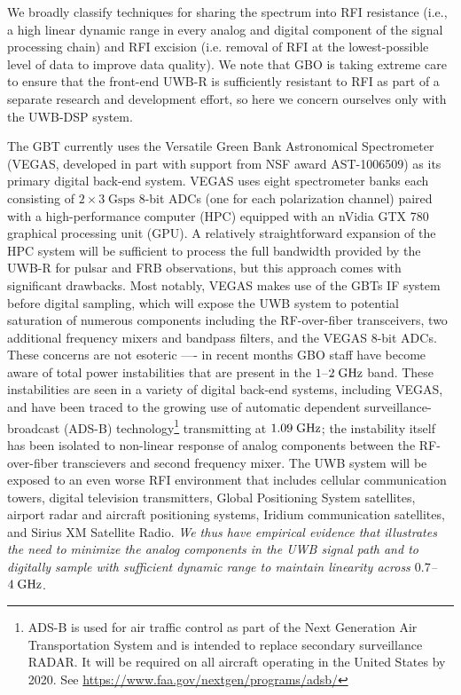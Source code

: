 \documentclass[10pt]{myNSF}
\begin{document}
We broadly classify techniques for sharing the spectrum into RFI
resistance (i.e., a high linear dynamic range in every analog and
digital component of the signal processing chain) and RFI excision
(i.e. removal of RFI at the lowest-possible level of data to improve
data quality).  We note that GBO is taking extreme care to ensure that
the front-end UWB-R is sufficiently resistant to RFI as part of a
separate research and development effort, so here we concern ourselves
only with the UWB-DSP system.

 The GBT currently uses the Versatile
Green Bank Astronomical Spectrometer (VEGAS, developed in part with
support from NSF award AST-1006509) as its primary digital back-end
system.  VEGAS uses eight spectrometer banks each consisting of $2
\times 3\; \mathrm{Gsps}$ 8-bit ADCs (one for each polarization
channel) paired with a high-performance computer (HPC) equipped with
an nVidia GTX 780 graphical processing unit (GPU).  A relatively
straightforward expansion of the HPC system will be sufficient to
process the full bandwidth provided by the UWB-R for pulsar and FRB
observations, but this approach comes with significant drawbacks.
Most notably, VEGAS makes use of the GBTs IF system before digital
sampling, which will expose the UWB system to potential saturation of
numerous components including the RF-over-fiber transceivers, two
additional frequency mixers and bandpass filters, and the VEGAS 8-bit
ADCs.  These concerns are not esoteric ---- in recent months GBO staff
have become aware of total power instabilities that are present in the
$1$--$2\; \textrm{GHz}$ band.  These instabilities are seen in a variety of
digital back-end systems, including VEGAS, and have been traced to the
growing use of automatic dependent surveillance-broadcast (ADS-B)
technology\footnote{ADS-B is used for air traffic control as part of
  the Next Generation Air Transportation System and is intended to
  replace secondary surveillance RADAR.  It will be required on all
  aircraft operating in the United States by 2020.  See
  \url{https://www.faa.gov/nextgen/programs/adsb/}} transmitting at
$1.09\; \textrm{GHz}$; the instability itself has been isolated to non-linear
response of analog components between the RF-over-fiber transcievers
and second frequency mixer.  The UWB system will be exposed to an even
worse RFI environment that includes cellular communication towers,
digital television transmitters, Global Positioning System satellites,
airport radar and aircraft positioning systems, Iridium communication
satellites, and Sirius XM Satellite Radio.  \emph{We thus have
  empirical evidence that illustrates the need to minimize the analog
  components in the UWB signal path and to digitally sample with
  sufficient dynamic range to maintain linearity across $0.7$--$4\;
  \textrm{GHz}$}.
\end{document}

